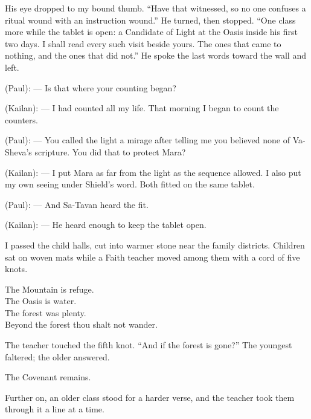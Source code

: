 His eye dropped to my bound thumb. ``Have that witnessed, so no one confuses a ritual wound with an instruction wound.'' He turned, then stopped. ``One class more while the tablet is open: a Candidate of Light at the Oasis inside his first two days. I shall read every such visit beside yours. The ones that came to nothing, and the ones that did not.'' He spoke the last words toward the wall and left.\par

\begin{room}

(Paul): --- Is that where your counting began?

(Kailan): --- I had counted all my life. That morning I began to count the counters.

(Paul): --- You called the light a mirage after telling me you believed none of Va-Sheva's scripture. You did that to protect Mara?

(Kailan): --- I put Mara as far from the light as the sequence allowed. I also put my own seeing under Shield's word. Both fitted on the same tablet.

(Paul): --- And Sa-Tavan heard the fit.

(Kailan): --- He heard enough to keep the tablet open.

\end{room}

I passed the child halls, cut into warmer stone near the family districts. Children sat on woven mats while a Faith teacher moved among them with a cord of five knots.\par

\begin{scripture}
The Mountain is refuge. \\
The Oasis is water. \\
The forest was plenty. \\
Beyond the forest thou shalt not wander.
\end{scripture}

The teacher touched the fifth knot. ``And if the forest is gone?'' The youngest faltered; the older answered.\par

\begin{scripture}
The Covenant remains.
\end{scripture}

Further on, an older class stood for a harder verse, and the teacher took them through it a line at a time. \par

